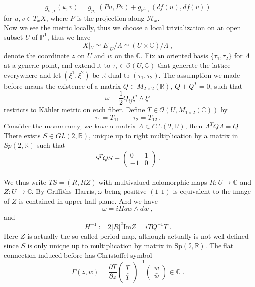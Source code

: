$$g_{\textrm{sf},\epsilon}(u,v)=g_{p,\epsilon}(Pu,Pv)+g_{\mathbb{P}^1,\epsilon}(df(u),df(v))$$
for $u,v\in T_xX$, where $P$ is the projection along $\mathscr{H}_x$.\\ \indent
Now we see the metric locally, thus we choose a local trivialization on an open subset $U$ of $\mathbb{P}^1$, thus we have
$$X|_U\simeq E|_U/\Lambda \simeq(U\times \mathbb{C})/\Lambda \; ,$$
denote the coordinate $z$ on $U$ and $w$ on the $\mathbb{C}$.
Fix an oriented basis $\{\tau_1,\tau_2\}$ for $\Lambda$ at a generic point, and extend it to $\tau_i\in \mathscr{O}(U,\mathbb{C})$ that generate the lattice everywhere and let $(\xi^1,\xi^2)$ be $\mathbb{R}$-dual to $(\tau_1,\tau_2)$. The assumption we made before means the existence of a matrix $Q\in M_{2\times2}(\mathbb{R})$, $Q+Q^T=0$, such that
$$\omega=\frac{1}{2}Q_{ij}\xi^i\wedge\xi^j$$
restricts to K{\"a}hler metric on each fiber. Define $T\in \mathscr{O}(U,M_{1\times2}(\mathbb{C}))$ by
$$\tau_1=T_{11}\qquad \tau_2=T_{12}\; .$$
\indent Consider the monodromy, we have a matrix $A\in GL(2,\mathbb{R})$, then $A^TQA=Q$. There exists $S\in GL(2,\mathbb{R})$, unique up to right multiplication by a matrix in $Sp(2,\mathbb{R})$ such that $$S^TQS=\begin{pmatrix}
0 & 1\\
-1 & 0
\end{pmatrix}\; .$$
\\ \indent We thus write $TS=(R,RZ)$ with multivalued holomorphic maps $R:U\rightarrow \mathbb{C}$ and $Z:U\rightarrow \mathbb{C}$. By Griffiths--Harris\cite{griffiths1978principles}, $\omega$ being positive $(1,1)$ is equivalent to the image of $Z$ is contained in upper-half plane. And we have
$$\omega=iH dw\wedge d\bar{w}\; ,$$
and
$$H^{-1}:=2|R|^2\textrm{Im}  Z=i\bar{T}Q^{-1}T\; .$$
\indent Here $Z$ is actually the so called period map, although actually is not well-defined since $S$ is only unique up to multiplication by matrix in $\textrm{Sp}(2,\mathbb{R})$. The flat connection induced before has Christoffel symbol
$$\Gamma(z,w)=\frac{\partial T}{\partial z}\begin{pmatrix}
T \\
\bar{T}
\end{pmatrix}^{-1}\begin{pmatrix}
w\\
\bar{w}
\end{pmatrix}\in\mathbb{C}\; .$$
\\ \indent


